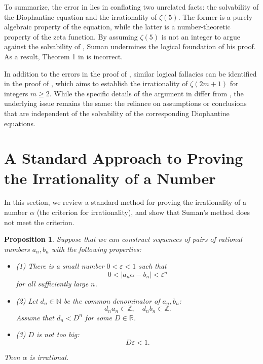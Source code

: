 \documentclass[12pt,reqno]{amsart}
\newtheorem{prop}[thm]{Proposition}
\theoremstyle{definition}
\numberwithin{equation}{section}
\begin{document}
To summarize, the error in \cite[Theorem 1]{Suman2024} lies in conflating two unrelated facts: the solvability of the Diophantine equation \cite[Eq. (48)]{Suman2024} and the irrationality of \(\zeta(5)\). The former is a purely algebraic property of the equation, while the latter is a number-theoretic property of the zeta function. By assuming \(\zeta(5)\) is not an integer to argue against the solvability of \cite[Eq. (48)]{Suman2024}, Suman undermines the logical foundation of his proof. As a result, Theorem 1 in \cite{Suman2024} is incorrect.

In addition to the errors in the proof of \cite[Theorem 1]{Suman2024}, similar logical fallacies can be identified in the proof of \cite[Theorem 2]{Suman2024}, which aims to establish the irrationality of \(\zeta(2m+1)\) for integers \(m \geq 2\). While the specific details of the argument in \cite[Theorem 2]{Suman2024} differ from \cite[Theorem 1]{Suman2024}, the underlying issue remains the same: the reliance on assumptions or conclusions that are independent of the solvability of the corresponding Diophantine equations.

\section{A Standard Approach to Proving the Irrationality of a Number}\label{s3}

In this section, we review a standard method for proving the irrationality of a number \(\alpha\) (the criterion for irrationality), and show that Suman's method does not meet the criterion.

\begin{prop}\label{p1}
Suppose that we can construct sequences of pairs of rational numbers \(a_n, b_n\) with the following properties:
\begin{itemize}
    \item (1) There is a small number \(0 < \varepsilon < 1\) such that
    $$
    0 < \left| a_n \alpha - b_n \right| < \varepsilon^n
    $$
    for all sufficiently large \(n\).
    \item (2) Let \(d_n \in \mathbb{N}\) be the common denominator of \(a_n, b_n\):
    $$
    d_n a_n \in \mathbb{Z}, \quad d_n b_n \in \mathbb{Z}.
    $$
    Assume that \(d_n < D^n\) for some \(D \in \mathbb{R}\).
    \item (3) \(D\) is not too big:
    $$
    D \varepsilon < 1.
    $$
\end{itemize}
Then \(\alpha\) is irrational.
\end{prop}
\end{document}
